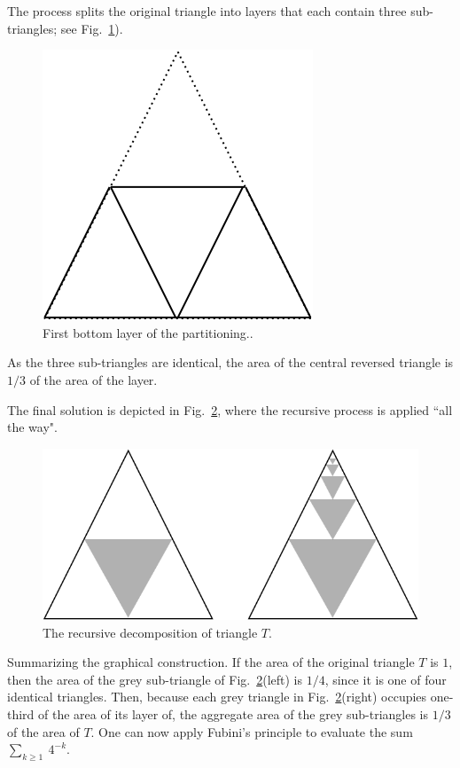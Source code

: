 \begin{itemize}
The process splits the original triangle into layers that each contain three sub-triangles; see
Fig.~\ref{Fig:Sum1over4FirstLayer}). 
\begin{figure}
\begin{center}
        \includegraphics[scale=0.3]{FiguresMaths/Sum1over4FirstLayer}
        \caption{First bottom layer of the partitioning..}
        \label{Fig:Sum1over4FirstLayer}
\end{center}
\end{figure}
As the three sub-triangles are identical, the area of the central reversed triangle is $1/3$ of the area of the layer. 

\smallskip

The final solution is depicted in Fig.~\ref{Fig:Sum1over4cascade}, where the recursive process is applied ``all the way". 
\begin{figure}
\begin{center}
        \includegraphics[scale=0.3]{FiguresMaths/Sum1over4cascade}
        \caption{The recursive decomposition of triangle $T$.}
        \label{Fig:Sum1over4cascade}
\end{center}
\end{figure}
Summarizing  the graphical construction.  If the area of the original triangle $T$ is $1$, then 
the area of the grey sub-triangle of Fig.~\ref{Fig:Sum1over4cascade}(left) is $1/4$, since it is one of four identical triangles.  Then, because each grey triangle in Fig.~\ref{Fig:Sum1over4cascade}(right) occupies one-third of the area of its layer of, the aggregate area of the grey sub-triangles is $1/3$ of the area of $T$.  One can now apply Fubini's principle to evaluate the sum $\sum_{k \geq 1} \ 4^{-k}$.
\end{itemize}

